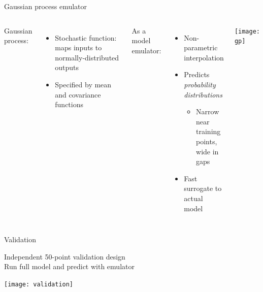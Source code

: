 \documentclass{beamer}
\begin{document}
\begin{frame}{Gaussian process emulator}
  \vspace{1em}
  \begin{columns}[c]
    Gaussian process:
    \begin{itemize}
      \item Stochastic function: maps inputs to normally-distributed outputs
      \item Specified by mean and covariance functions
    \end{itemize}
    \bigskip
    As a model emulator:
    \begin{itemize}
      \item Non-parametric interpolation
      \item Predicts \emph{probability distributions}
        \begin{itemize}
          \item Narrow near training points, \\ wide in gaps
        \end{itemize}
      \item Fast surrogate to actual model
    \end{itemize}
    \texttt{[image: gp]}
  \end{columns}
\end{frame}

\begin{frame}{Validation}
  \begin{center}
    Independent 50-point validation design \\[1em]
    Run full model and predict with emulator
  \end{center}
  \texttt{[image: validation]}
\end{frame}


\newcommand{\st}{_\star}
\newcommand{\ex}{_\text{exp}}
\end{document}
